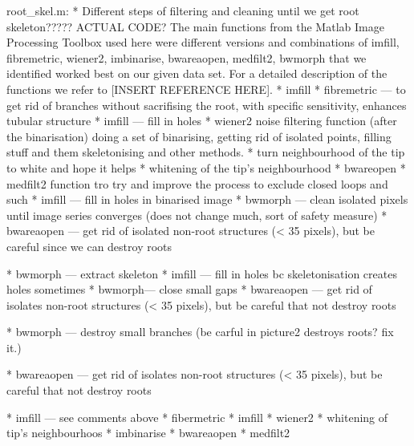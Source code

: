 root_skel.m: 
* Different steps of filtering and cleaning until we get root skeleton????? ACTUAL CODE?
The main functions from the Matlab Image Processing Toolbox used here were different versions and combinations of imfill, fibremetric, wiener2, imbinarise, bwareaopen, medfilt2, bwmorph that we identified worked best on our given data set. For a detailed description of the functions we refer to [INSERT REFERENCE HERE].
* imfill
* fibremetric — to get rid of branches without sacrifising the root, with specific sensitivity, enhances tubular structure
* imfill — fill in holes
* wiener2 noise filtering function (after the binarisation)
doing a set of binarising, getting rid of isolated points, filling stuff and them skeletonising and other methods.
* turn neighbourhood of the tip to white and hope it helps
* whitening of the tip’s neighbourhood
* bwareopen
* medfilt2 function tro try and improve the process to exclude closed loops and such
* imfill — fill in holes in binarised image
* bwmorph — clean isolated pixels until image series converges (does not change much, sort of safety measure)
* bwareaopen — get rid of isolated non-root structures (< 35 pixels), but be careful since we can destroy roots

* bwmorph — extract skeleton
* imfill — fill in holes bc skeletonisation creates holes sometimes
* bwmorph— close small gaps
* bwareaopen — get rid of isolates non-root structures (< 35 pixels), but be careful that not destroy roots

* bwmorph — destroy small branches (be carful in picture2 destroys roots? fix it.)

* bwareaopen — get rid of isolates non-root structures (< 35 pixels), but be careful that not destroy roots

* imfill — see comments above
* fibermetric
* imfill
* wiener2
* whitening of tip’s neighbourhoos
* imbinarise
* bwareaopen
* medfilt2

